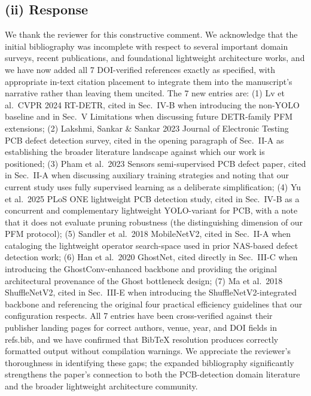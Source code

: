 \documentclass[conference]{IEEEtran}
\begin{document}
\subsection*{(ii) Response}
We thank the reviewer for this constructive comment. We acknowledge that the initial bibliography was incomplete with respect to several important domain surveys, recent publications, and foundational lightweight architecture works, and we have now added all 7 DOI-verified references exactly as specified, with appropriate in-text citation placement to integrate them into the manuscript's narrative rather than leaving them uncited. The 7 new entries are: (1) Lv et al.~CVPR 2024 RT-DETR, cited in Sec.~IV-B when introducing the non-YOLO baseline and in Sec.~V Limitations when discussing future DETR-family PFM extensions; (2) Lakshmi, Sankar \& Sankar 2023 Journal of Electronic Testing PCB defect detection survey, cited in the opening paragraph of Sec.~II-A as establishing the broader literature landscape against which our work is positioned; (3) Pham et al.~2023 Sensors semi-supervised PCB defect paper, cited in Sec.~II-A when discussing auxiliary training strategies and noting that our current study uses fully supervised learning as a deliberate simplification; (4) Yu et al.~2025 PLoS ONE lightweight PCB detection study, cited in Sec.~IV-B as a concurrent and complementary lightweight YOLO-variant for PCB, with a note that it does not evaluate pruning robustness (the distinguishing dimension of our PFM protocol); (5) Sandler et al.~2018 MobileNetV2, cited in Sec.~II-A when cataloging the lightweight operator search-space used in prior NAS-based defect detection work; (6) Han et al.~2020 GhostNet, cited directly in Sec.~III-C when introducing the GhostConv-enhanced backbone and providing the original architectural provenance of the Ghost bottleneck design; (7) Ma et al.~2018 ShuffleNetV2, cited in Sec.~III-E when introducing the ShuffleNetV2-integrated backbone and referencing the original four practical efficiency guidelines that our configuration respects. All 7 entries have been cross-verified against their publisher landing pages for correct authors, venue, year, and DOI fields in refs.bib, and we have confirmed that BibTeX resolution produces correctly formatted output without compilation warnings. We appreciate the reviewer's thoroughness in identifying these gaps; the expanded bibliography significantly strengthens the paper's connection to both the PCB-detection domain literature and the broader lightweight architecture community.
\end{document}
